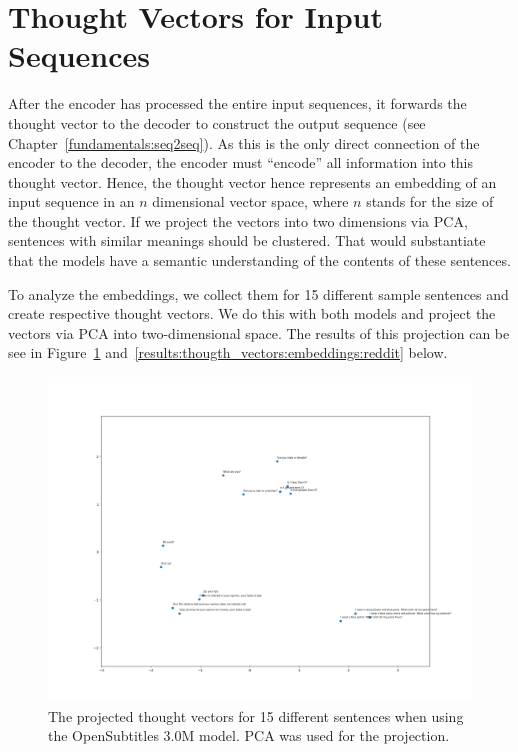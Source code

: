 \section{Thought Vectors for Input Sequences} After the encoder has processed the entire input sequences, it forwards the thought vector to the decoder to construct the output sequence (see Chapter~\ref{fundamentals:seq2seq}). As this is the only direct connection of the encoder to the decoder, the encoder must ``encode'' all information into this thought vector. Hence, the thought vector hence represents an embedding of an input sequence in an $n$ dimensional vector space, where $n$ stands for the size of the thought vector. If we project the vectors into two dimensions via PCA, sentences with similar meanings should be clustered. That would substantiate that the models have a semantic understanding of the contents of these sentences.

To analyze the embeddings, we collect them for 15 different sample sentences and create respective thought vectors. We do this with both models and project the vectors via PCA into two-dimensional space. The results of this projection can be see in Figure~\ref{results:thougth_vectors:embeddings:opensubtitles} and~\ref{results:thougth_vectors:embeddings:reddit} below.

\begin{figure}[!htb]
	\centering
	\includegraphics[width=14cm]{img/opensubtitles_thought_vector_embeddings.png}
	\caption{The projected thought vectors for 15 different sentences when using the OpenSubtitles 3.0M model. PCA was used for the projection.}
	\label{results:thougth_vectors:embeddings:opensubtitles}
\end{figure}

